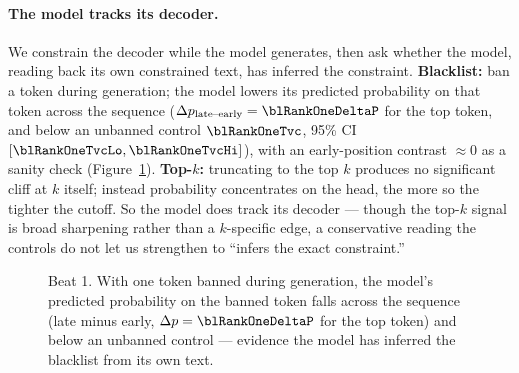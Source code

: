 \documentclass[11pt]{article}
\begin{document}
\paragraph{The model tracks its decoder.}
We constrain the decoder while the model generates, then ask whether the model,
reading back its own constrained text, has inferred the constraint.
\textbf{Blacklist:} ban a token during generation; the model lowers its predicted
probability on that token across the sequence
($\Delta p_{\text{late--early}} = \blRankOneDeltaP$ for the top token, and below
an unbanned control $\blRankOneTvc$, 95\% CI $[\blRankOneTvcLo,\blRankOneTvcHi]$),
with an early-position contrast $\approx 0$ as a sanity check
(Figure~\ref{fig:blacklist}).
\textbf{Top-$k$:} truncating to the top $k$ produces no significant cliff at $k$
itself; instead probability concentrates on the head, the more so the tighter the
cutoff.
So the model does track its decoder --- though the top-$k$ signal is broad
sharpening rather than a $k$-specific edge, a conservative reading the controls do
not let us strengthen to ``infers the exact constraint.''

\begin{figure}[t]
\centering
\phantom{X}%
\caption{Beat 1. With one token banned during generation, the model's predicted
probability on the banned token falls across the sequence (late minus early,
$\Delta p = \blRankOneDeltaP$ for the top token) and below an unbanned control ---
evidence the model has inferred the blacklist from its own text.}
\label{fig:blacklist}
\end{figure}

\end{document}
